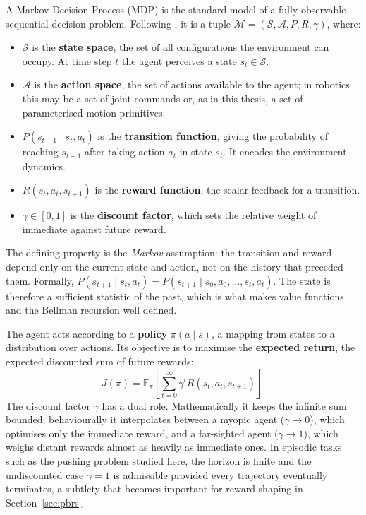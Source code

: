 A Markov Decision Process (MDP) is the standard model of a fully observable
sequential decision problem. Following \cite{Ng1999PolicyInvariance,
Sutton1998}, it is a tuple $\mathcal{M} = (\mathcal{S}, \mathcal{A}, P, R,
\gamma)$, where:
\begin{itemize}
  \item $\mathcal{S}$ is the \textbf{state space}, the set of all configurations
        the environment can occupy. At time step $t$ the agent perceives a state
        $s_t \in \mathcal{S}$.
  \item $\mathcal{A}$ is the \textbf{action space}, the set of actions available
        to the agent; in robotics this may be a set of joint commands or, as in
        this thesis, a set of parameterised motion primitives.
  \item $P(s_{t+1} \mid s_t, a_t)$ is the \textbf{transition function}, giving the
        probability of reaching $s_{t+1}$ after taking action $a_t$ in state
        $s_t$. It encodes the environment dynamics.
  \item $R(s_t, a_t, s_{t+1})$ is the \textbf{reward function}, the scalar
        feedback for a transition.
  \item $\gamma \in [0, 1]$ is the \textbf{discount factor}, which sets the
        relative weight of immediate against future reward.
\end{itemize}

The defining property is the \emph{Markov} assumption: the transition and reward
depend only on the current state and action, not on the history that preceded
them. Formally, $P(s_{t+1} \mid s_t, a_t) = P(s_{t+1} \mid s_0, a_0, \dots, s_t,
a_t)$. The state is therefore a sufficient statistic of the past, which is what
makes value functions and the Bellman recursion well defined.

The agent acts according to a \textbf{policy} $\pi(a \mid s)$, a mapping from
states to a distribution over actions. Its objective is to maximise the
\textbf{expected return}, the expected discounted sum of future rewards:
\begin{equation}
    J(\pi) = \mathbb{E}_{\pi}\!\left[ \sum_{t=0}^{\infty} \gamma^t R(s_t, a_t, s_{t+1}) \right].
    \label{eq:return}
\end{equation}
The discount factor $\gamma$ has a dual role. Mathematically it keeps the
infinite sum bounded; behaviourally it interpolates between a myopic agent
($\gamma \to 0$), which optimises only the immediate reward, and a far-sighted
agent ($\gamma \to 1$), which weighs distant rewards almost as heavily as
immediate ones. In episodic tasks such as the pushing problem studied here, the
horizon is finite and the undiscounted case $\gamma = 1$ is admissible provided
every trajectory eventually terminates, a subtlety that becomes important for
reward shaping in Section~\ref{sec:pbrs}.

